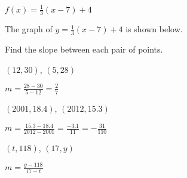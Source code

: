 \begin{essentialskills}
\begin{problem}
\begin{multicols}{3}
\begin{subproblem}
\begin{shortsolution}
			\end{shortsolution}
		\end{subproblem}
		\begin{subproblem}
			$f(x)=\frac{1}{3}(x-7)+4$
			\begin{shortsolution}
				The graph of $y=\frac{1}{3}(x-7)+4$ is shown below.
																																			
			\end{shortsolution}
		\end{subproblem}
	\end{multicols}
	\end{problem}
											
	\begin{problem}
	Find the slope between each pair of points.
	\begin{multicols}{2}
		\begin{subproblem}
			$(12,30)$, $(5,28)$
			\begin{shortsolution}
				$m=\frac{28-30}{5-12}=\frac{2}{7}$
			\end{shortsolution}
		\end{subproblem}
		\begin{subproblem}
			$(2001,18.4)$, $(2012,15.3)$
			\begin{shortsolution}
				$m=\frac{15.3-18.4}{2012-2001}=\frac{-3.1}{11}=-\frac{31}{110}$
			\end{shortsolution}
		\end{subproblem}
		\begin{subproblem}
			$(t,118)$, $(17,y)$
			\begin{shortsolution}
				$m=\frac{y-118}{17-t}$
			\end{shortsolution}
		\end{subproblem}
	\end{multicols}
	\end{problem}
											

\end{essentialskills}
